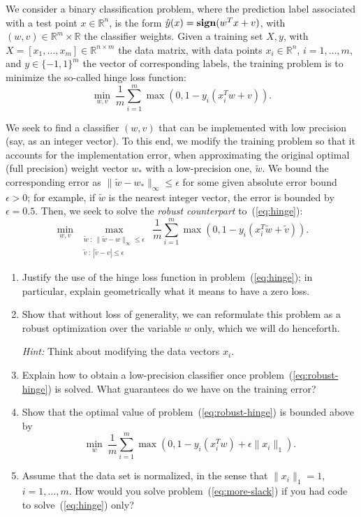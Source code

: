 \documentclass[11pt]{article}
\begin{document}
We consider a binary classification problem, where the prediction label associated with a test point $x \in \mathbb{R}^{n}$, is the form $\hat{y}(x) = \mbox{\bf sign}(w^Tx+v)$, with $(w,v) \in \mathbb{R}^{m} \times \mathbb{R}$ the classifier weights. Given a training set $X,y$, with $X = [x_1,\ldots,x_m]\in \mathbb{R}^{n \times m}$ the data matrix, with data points $x_i \in \mathbb{R}^{n}$, $i=1,\ldots,m$, and $y \in \{-1,1\}^m$ the vector of corresponding labels, the training problem is to minimize the so-called hinge loss function:
\begin{equation}\label{eq:hinge}
    \min_{w,v} \: \frac{1}{m}\sum_{i=1}^m \max(0,1-y_i(x_i^Tw + v)).
\end{equation}

We seek to find a classifier $(w,v)$ that can be implemented with low precision (say, as an integer vector). To this end, we modify the training problem so that it accounts for the implementation error, when approximating the original optimal (full precision) weight vector $w_*$ with a low-precision one, $\tilde{w}$.  We bound the corresponding error as $\|\tilde{w}-w_*\|_\infty \le \epsilon$ for some given absolute error bound $\epsilon >0$; for example, if $\tilde{w}$ is the nearest integer vector, the error is bounded by $\epsilon = 0.5$. Then, we seek to solve the \emph{robust counterpart} to~(\ref{eq:hinge}):
\begin{equation}\label{eq:robust-hinge}
    \min_{w,v} \: \max_{\substack{\tilde{w} \::\: \|\tilde{w}-w\|_\infty \le \epsilon \\ \tilde{v} \::\: |\tilde{v}-v| \le \epsilon}} \: \frac{1}{m}
    \sum_{i=1}^m \max(0, 1-y_i(x_i^T\tilde{w} + \tilde{v}) ).
\end{equation}
\begin{enumerate}
    \item Justify the use of the hinge loss function in problem~(\ref{eq:hinge}); in particular, explain geometrically what it means to have a zero loss.

    \item Show that without loss of generality, we can reformulate this problem as a robust optimization over the variable $w$ only, which we will do henceforth.

    {\em Hint:} Think about modifying the data vectors $x_i$.

    \item Explain how to obtain a low-precision classifier once problem~(\ref{eq:robust-hinge}) is solved. What guarantees do we have on the training error?

    \item Show that the optimal value of problem~(\ref{eq:robust-hinge}) is bounded above by
\begin{equation}\label{eq:more-slack}
    \min_{w} \: \frac{1}{m}\sum_{i=1}^m \max(0, 1-y_i(x_i^Tw)+\epsilon \|x_i\|_1).
\end{equation}

\item Assume that the data set is normalized, in the sense that $\|x_i\|_1 = 1$, $i=1,\ldots,m$. How would you solve problem~(\ref{eq:more-slack}) if you had code to solve~(\ref{eq:hinge}) only?
\end{enumerate}

\begin{solution}
\end{solution}
\end{document}
